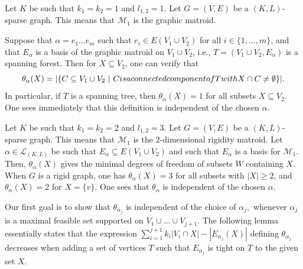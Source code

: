 \documentclass{article}
\begin{document}
\begin{example}
Let $K$ be such that $k_1 = k_2 =1$ and $l_{1,2} = 1$.  Let $G=(V, E)$ be a $(K,L)$-sparse graph. This means that $\mathcal{M}_1$ is the graphic matroid.

Suppose that $\alpha=e_1 \dots e_m$ such that $e_i \in E(V_1 \cup V_2)$ for all $i\in \{1, \dots, m\}$, and that $E_{\alpha}$ is a basis of the graphic matroid on $V_1\cup V_2$, i.e., $T= (V_1\cup V_2, E_{\alpha})$ is a spanning forest. Then for $X\subseteq V_2$, one can verify that 
\begin{equation*}
\theta_{\alpha}(X) = | \{C \subseteq V_1\cup V_2 ~|~ C \textup{ is a connected component of } T \textup{ with } X\cap C \neq \emptyset \}|.  
\end{equation*}
In particular, if $T$ is a spanning tree, then $\theta_{\alpha}(X)= 1$ for all subsets $X\subseteq V_2$. One sees immediately that this definition is independent of the chosen $\alpha$.
\end{example}

\begin{example}
Let $K$ be such that $k_1 = k_2 =2$ and $l_{1,2} = 3$. 
Let $G=(V, E)$ be a $(K,L)$-sparse graph. This means that $\mathcal{M}_1$ is the $2$-dimensional rigidity matroid. Let $\alpha \in \mathcal{L}_{(K,L)}$ be such that $E_{\alpha}\subseteq E(V_1 \cup V_2)$ and such that $E_\alpha$ is a basis for $\mathcal{M}_1$. Then, $\theta_{\alpha}(X)$ gives the minimal degrees of freedom of subsets $W$ containing $X$. When $G$ is a rigid graph, one has $\theta_{\alpha}(X) = 3$ for all subsets with $|X|\geq 2$, and $\theta_{\alpha}(X) = 2$ for $X=\{v\}$. One sees that $\theta_{\alpha}$ is independent of the chosen $\alpha$.
\end{example}

Our first goal is to show that $\theta_{\alpha_j}$ is independent of the choice of $\alpha_j,$ whenever $\alpha_j$ is a maximal feasible set supported on $V_1\cup \dots \cup V_{j+1}$. The following lemma essentially states that the expression $\sum_{i=1}^{j+1} k_i|V_i \cap X| - |E_{\alpha_{j}}(X)|$ defining $\theta_{\alpha_j}$ decreases when adding a set of vertices $T$ such that $E_{\alpha_j}$ is tight on $T$ to the given set $X$.
\end{document}
